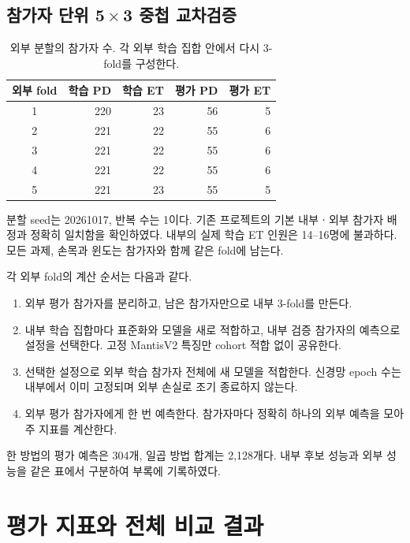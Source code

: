 \documentclass[11pt,a4paper]{article}
\numberwithin{equation}{section}
\begin{document}
\subsection{참가자 단위 5\,$\times$\,3 중첩 교차검증}
\begin{table}[H]\centering\small
\caption{외부 분할의 참가자 수. 각 외부 학습 집합 안에서 다시 3-fold를 구성한다.}
\begin{tabular}{@{}crrrr@{}}\toprule
 외부 fold & 학습 PD & 학습 ET & 평가 PD & 평가 ET\\\midrule
1 & 220 & 23 & 56 & 5 \\
2 & 221 & 22 & 55 & 6 \\
3 & 221 & 22 & 55 & 6 \\
4 & 221 & 22 & 55 & 6 \\
5 & 221 & 23 & 55 & 5 \\
\bottomrule\end{tabular}\label{tab:splits}
\end{table}
분할 seed는 20261017, 반복 수는 1이다. 기존 프로젝트의 기본 내부ㆍ외부
참가자 배정과 정확히 일치함을 확인하였다. 내부의 실제 학습 ET 인원은
14--16명에 불과하다. 모든 과제, 손목과 윈도는 참가자와 함께 같은 fold에 남는다.

각 외부 fold의 계산 순서는 다음과 같다.
\begin{enumerate}
 \item 외부 평가 참가자를 분리하고, 남은 참가자만으로 내부 3-fold를 만든다.
 \item 내부 학습 집합마다 표준화와 모델을 새로 적합하고, 내부 검증 참가자의
 예측으로 설정을 선택한다. 고정 MantisV2 특징만 cohort 적합 없이 공유한다.
 \item 선택한 설정으로 외부 학습 참가자 전체에 새 모델을 적합한다.
 신경망 epoch 수는 내부에서 이미 고정되며 외부 손실로 조기 종료하지 않는다.
 \item 외부 평가 참가자에게 한 번 예측한다. 참가자마다 정확히 하나의
 외부 예측을 모아 주 지표를 계산한다.
\end{enumerate}
한 방법의 평가 예측은 304개, 일곱 방법 합계는 2,128개다.
내부 후보 성능과 외부 성능을 같은 표에서 구분하여 부록에 기록하였다.

\section{평가 지표와 전체 비교 결과}
\end{document}
